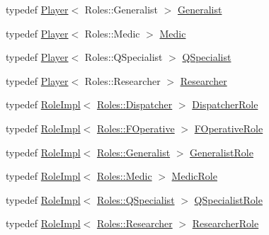 \begin{DoxyCompactItemize}
\item 
typedef \hyperlink{classpan_1_1_player}{Player}$<$ Roles\+::\+Generalist $>$ \hyperlink{namespacepan_a14b9d4ed4f5f1fd23e2b1ddbe4694af1}{Generalist}
\item 
typedef \hyperlink{classpan_1_1_player}{Player}$<$ Roles\+::\+Medic $>$ \hyperlink{namespacepan_a39b98933acd44960f306cbc3d8e103b2}{Medic}
\item 
typedef \hyperlink{classpan_1_1_player}{Player}$<$ Roles\+::\+Q\+Specialist $>$ \hyperlink{namespacepan_aa6a54a1d51f672be7f348ea3883096bc}{Q\+Specialist}
\item 
typedef \hyperlink{classpan_1_1_player}{Player}$<$ Roles\+::\+Researcher $>$ \hyperlink{namespacepan_aec10143cf4ec83bfb6fb2700234682fe}{Researcher}
\item 
typedef \hyperlink{classpan_1_1_role_impl}{Role\+Impl}$<$ \hyperlink{namespacepan_a5017f84fa51152eae453759537d1ced6adbfcc2e96980bb87c34df3809193c62a}{Roles\+::\+Dispatcher} $>$ \hyperlink{namespacepan_a12e950ceae92e469668e9d7a5ce6c629}{Dispatcher\+Role}
\item 
typedef \hyperlink{classpan_1_1_role_impl}{Role\+Impl}$<$ \hyperlink{namespacepan_a5017f84fa51152eae453759537d1ced6a97b293ec5041fbbf87730876a2d388c5}{Roles\+::\+F\+Operative} $>$ \hyperlink{namespacepan_a7b1b888df0832e31a74bfb724e44914a}{F\+Operative\+Role}
\item 
typedef \hyperlink{classpan_1_1_role_impl}{Role\+Impl}$<$ \hyperlink{namespacepan_a5017f84fa51152eae453759537d1ced6a824390b43737bdd9821c864af71f1f86}{Roles\+::\+Generalist} $>$ \hyperlink{namespacepan_aea2d78776fac8fe1832de0f89c365d6a}{Generalist\+Role}
\item 
typedef \hyperlink{classpan_1_1_role_impl}{Role\+Impl}$<$ \hyperlink{namespacepan_a5017f84fa51152eae453759537d1ced6a9e41f6e7578581eac9832bcd68732ae1}{Roles\+::\+Medic} $>$ \hyperlink{namespacepan_a3354cb9412fa301cd3f604393dc07e98}{Medic\+Role}
\item 
typedef \hyperlink{classpan_1_1_role_impl}{Role\+Impl}$<$ \hyperlink{namespacepan_a5017f84fa51152eae453759537d1ced6ae0f77fedb512beb1711d43d21dc3aa47}{Roles\+::\+Q\+Specialist} $>$ \hyperlink{namespacepan_a399797d578fb2a50312818f52b94f8dd}{Q\+Specialist\+Role}
\item 
typedef \hyperlink{classpan_1_1_role_impl}{Role\+Impl}$<$ \hyperlink{namespacepan_a5017f84fa51152eae453759537d1ced6ae333508b3f7d851e40075d1eb5a0eae8}{Roles\+::\+Researcher} $>$ \hyperlink{namespacepan_a0854d847c20b733c1bf18983cb926d5a}{Researcher\+Role}
\end{DoxyCompactItemize}
